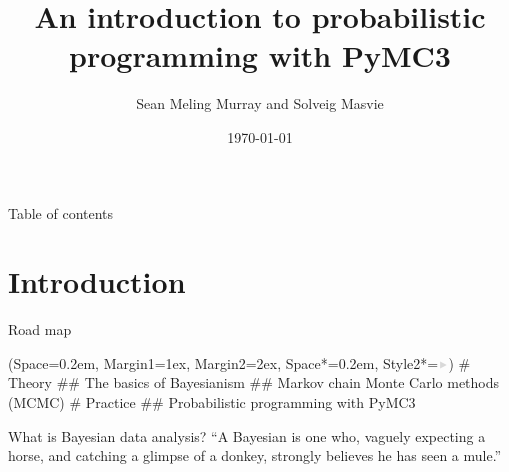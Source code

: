 \documentclass[12pt, aspectratio=149]{beamer}
\title{An introduction to probabilistic programming with PyMC3}
\date{\today}
\author{Sean Meling Murray and Solveig Masvie}
\newcommand{\listSpace}{0.2em}
\theoremstyle{plain}
\begin{document}
\maketitle
{}
  
\begin{frame}{Table of contents}
	\tableofcontents
\end{frame}

\section{Introduction}
\begin{frame}[fragile]{Road map}
	\begin{easylist}[itemize]
		\ListProperties(Space=\listSpace, Margin1=1ex, Margin2=2ex, Space*=\listSpace, Style2*=$\color{bggraydark}\blacktriangleright$\space)
		# Theory
		## The basics of Bayesianism
		## Markov chain Monte Carlo methods (MCMC)
		# Practice
		## Probabilistic programming with PyMC3
	\end{easylist}
\end{frame}

\begin{frame}[fragile]{What is Bayesian data analysis?}
	``A Bayesian is one who, vaguely expecting a horse, and catching a glimpse of a donkey, strongly believes he has seen a mule.''
\end{frame}
\end{document}
